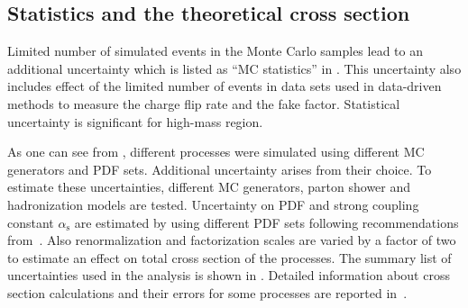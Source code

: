 \subsection{Statistics and the theoretical cross section}
Limited number of simulated events in the Monte Carlo samples lead to an additional uncertainty which is listed as ``MC statistics'' in .
This uncertainty also includes effect of the limited number of events in data sets used in data-driven methods to measure the charge flip rate and the fake factor.
Statistical uncertainty is significant for high-mass region.

As one can see from , different processes were simulated using different MC generators and PDF sets.
Additional uncertainty arises from  their choice.
To estimate these uncertainties, different MC generators, parton shower and hadronization models are tested.
Uncertainty on PDF and strong coupling constant $\alpha_{\mathrm{s}}$ are estimated by using different PDF sets following recommendations from~\cite{pdf4lhc}.
Also renormalization and factorization scales are varied by a factor of two to estimate an effect on total cross section of the processes.
The summary list of uncertainties used in the analysis is shown in .
Detailed information about cross section calculations and their errors for some processes 
are reported in~\cite{diboson_cross_section,ttW_cross_section,ttV_cross_section}.

